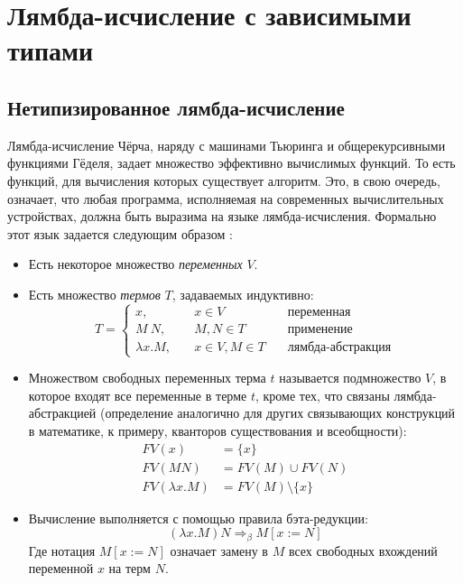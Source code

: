 \section{Лямбда-исчисление с зависимыми типами}

\subsection{Нетипизированное лямбда-исчисление}

Лямбда-исчисление Чёрча, наряду с машинами Тьюринга и общерекурсивными функциями
Гёделя, задает множество эффективно вычислимых функций\cite{lambda-calculus-syntax-and-semantics}.
То есть функций, для вычисления которых существует алгоритм. Это, в свою очередь,
означает, что любая программа, исполняемая на современных вычислительных устройствах,
должна быть выразима на языке лямбда-исчисления. Формально этот язык задается следующим образом
\cite{lambda-calculus-syntax-and-semantics}:
\begin{itemize}
\item Есть некоторое множество \textit{переменных} \(V\).
\item Есть множество \textit{термов} \(T\), задаваемых индуктивно:
   \[
   T = \left\{
   \begin{array}{lrr}
   x,\quad& x \in V\quad&\text{переменная}\\
   M\ N,\quad& M, N \in T\quad&\text{применение}\\
   \lambda x. M,\quad& x \in V, M \in T\quad&\text{лямбда-абстракция}
   \end{array}
   \right.
   \]
\item Множеством свободных переменных терма \(t\) называется подмножество \(V\),
   в которое входят все переменные в терме \(t\), кроме тех, что связаны
   лямбда-абстракцией (определение аналогично для других связывающих
   конструкций в математике, к примеру, кванторов существования и всеобщности):
   \begin{align*}
   FV(x) &= \{x\}\\
   FV(M N) &= FV(M) \cup FV(N)\\
   FV(\lambda x. M) &= FV(M) \setminus \{x\}
   \end{align*}
\item Вычисление выполняется с помощью правила бэта-редукции:
   \[
   (\lambda x. M) N \Rightarrow_\beta M[x := N]
   \]
   Где нотация \(M[x := N]\) означает замену в \(M\) всех свободных вхождений переменной
   \(x\) на терм \(N\).
\end{itemize}


